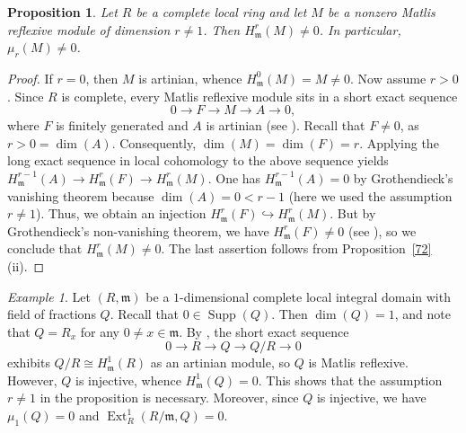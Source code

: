 \documentclass[11pt,a4paper]{amsart}
\numberwithin{equation}{section}
\newtheorem{proposition}[theorem]{Proposition}
\theoremstyle{definition}
\theoremstyle{remark}
\newtheorem{example}[theorem]{Example}
\begin{document}
\begin{proposition}
	Let \(R\) be a complete local ring and let \(M\) be a nonzero Matlis reflexive module of dimension \(r \neq 1\). Then \(H^r_{\mathfrak{m}}(M) \neq 0\). In particular, \(\mu_r(M) \neq 0\).
\end{proposition}

\begin{proof}
	If \(r = 0\), then \(M\) is artinian, whence \(H^0_{\mathfrak{m}}(M) = M \neq 0\). Now assume \(r > 0\). Since \(R\) is complete, every Matlis reflexive module sits in a short exact sequence
	\[
	0 \longrightarrow F \longrightarrow M \longrightarrow A \longrightarrow 0,
	\]
	where \(F\) is finitely generated and \(A\) is artinian (see \cite[page 92, Ex.~6]{en}). Recall that \(F \neq 0\), as \(r > 0 = \dim(A)\). Consequently, \(\dim(M) = \dim(F) = r\). Applying the long exact sequence in local cohomology to the above sequence yields
	\(
	H^{r-1}_{\mathfrak{m}}(A) \longrightarrow H^r_{\mathfrak{m}}(F) \longrightarrow H^r_{\mathfrak{m}}(M).
	\)
	One has \(H^{r-1}_{\mathfrak{m}}(A) = 0\) by Grothendieck's vanishing theorem because \(\dim(A) = 0 < r-1\) (here we used the assumption \(r \neq 1\)). Thus, we obtain an injection \(H^r_{\mathfrak{m}}(F) \hookrightarrow H^r_{\mathfrak{m}}(M)\). But by Grothendieck's non-vanishing theorem, we have \(H^r_{\mathfrak{m}}(F) \neq 0\) (see \cite[6.1.4]{BSh}), so we conclude that \(H^r_{\mathfrak{m}}(M) \neq 0\). The last assertion follows from Proposition~\ref{72}(ii).
\end{proof}


\begin{example}
	Let \((R,\mathfrak{m})\) be a \(1\)-dimensional complete local integral domain with field of fractions \(Q\). Recall that \(0 \in \operatorname{Supp}(Q)\). Then \(\dim(Q) = 1\), and note that \(Q = R_x\) for any \(0 \neq x \in \mathfrak{m}\). By \cite[Remark~2.2.20]{BSh}, the short exact sequence
	\[
	0 \longrightarrow R \longrightarrow Q \longrightarrow Q/R \longrightarrow 0
	\]
	exhibits \(Q/R \cong H^1_{\mathfrak{m}}(R)\) as an artinian module, so \(Q\) is Matlis reflexive. However, \(Q\) is injective, whence \(H^1_{\mathfrak{m}}(Q) = 0\). This shows that the assumption \(r \neq 1\) in the proposition is necessary. Moreover, since \(Q\) is injective, we have \(\mu_1(Q) = 0\) and \(\operatorname{Ext}^1_R(R/\mathfrak{m}, Q) = 0\).
\end{example}
\end{document}
